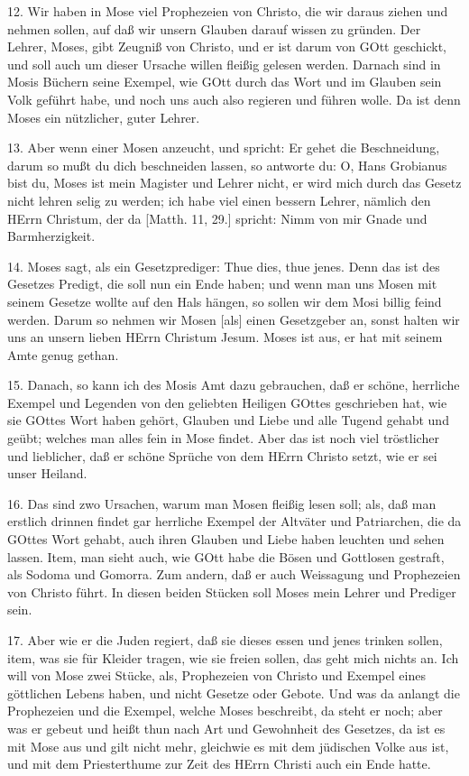 12. Wir haben in Mose viel Prophezeien von Christo, die wir daraus ziehen und nehmen sollen, auf daß wir unsern Glauben darauf wissen zu gründen. Der Lehrer, Moses, gibt Zeugniß von Christo, und er ist darum von GOtt geschickt, und soll auch um dieser Ursache willen fleißig gelesen werden. Darnach sind in Mosis Büchern seine Exempel, wie GOtt durch das Wort und im Glauben sein Volk geführt habe, und noch uns auch also regieren und führen wolle. Da ist denn Moses ein nützlicher, guter Lehrer.

13. Aber wenn einer Mosen anzeucht, und spricht: Er gehet die Beschneidung, darum so mußt du dich beschneiden lassen, so antworte du: O, Hans Grobianus bist du, Moses ist mein Magister und Lehrer nicht, er wird mich durch das Gesetz nicht lehren selig zu werden; ich habe viel einen bessern Lehrer, nämlich den HErrn Christum, der da [Matth. 11, 29.] spricht: Nimm von mir Gnade und Barmherzigkeit.

14. Moses sagt, als ein Gesetzprediger: Thue dies, thue jenes. Denn das ist des Gesetzes Predigt, die soll nun ein Ende haben; und wenn man uns Mosen mit seinem Gesetze wollte auf den Hals hängen, so sollen wir dem Mosi billig feind werden. Darum so nehmen wir Mosen [als] einen Gesetzgeber an, sonst halten wir uns
an unsern lieben HErrn Christum Jesum. Moses ist aus, er hat mit seinem Amte genug gethan.

15. Danach, so kann ich des Mosis Amt dazu gebrauchen, daß er schöne, herrliche Exempel und Legenden von den geliebten Heiligen GOttes geschrieben hat, wie sie GOttes Wort haben gehört, Glauben und Liebe und alle Tugend gehabt und geübt; welches man alles fein in Mose findet. Aber das ist noch viel tröstlicher und lieblicher, daß er schöne Sprüche von dem HErrn Christo setzt, wie er sei unser Heiland.

16. Das sind zwo Ursachen, warum man Mosen fleißig lesen soll; als, daß man erstlich drinnen findet gar herrliche Exempel der Altväter und Patriarchen, die da GOttes Wort gehabt, auch ihren Glauben und Liebe haben leuchten und sehen lassen. Item, man sieht auch, wie GOtt habe die Bösen und Gottlosen gestraft, als Sodoma und Gomorra. Zum andern, daß er auch Weissagung und Prophezeien von Christo führt. In diesen beiden Stücken soll Moses mein Lehrer und Prediger sein.

17. Aber wie er die Juden regiert, daß sie dieses essen und jenes trinken sollen, item, was sie für Kleider tragen, wie sie freien sollen, das geht mich nichts an. Ich will von Mose zwei Stücke, als, Prophezeien von Christo und Exempel eines göttlichen Lebens haben, und nicht Gesetze oder Gebote. Und was da anlangt die Prophezeien und die Exempel, welche Moses beschreibt, da steht er noch; aber was er gebeut und heißt thun nach Art und Gewohnheit des Gesetzes, da ist es mit Mose aus und gilt nicht mehr, gleichwie es mit dem jüdischen Volke aus ist, und mit dem Priesterthume zur Zeit des HErrn Christi auch ein Ende hatte.

